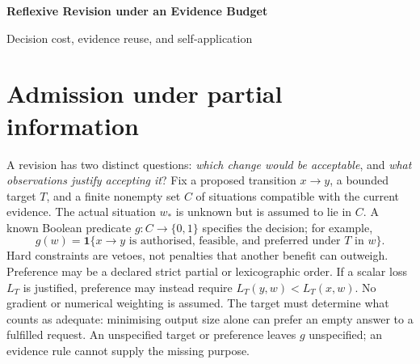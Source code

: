 \documentclass[11pt,letterpaper]{article}
\newcommand{\ind}{\mathbf 1}
\begin{document}
\begin{center}
{\Large\bfseries Reflexive Revision under an Evidence Budget}\par
\vspace{4pt}
{\normalsize Decision cost, evidence reuse, and self-application}
\end{center}
\vspace{-3pt}
\begin{abstract}
A revision decision can be identifiable but unaffordable; evidence sufficient for it can become inadequate when its purpose changes. In a finite exact-observation model, standard decision-tree optimisation gives the minimum worst-case cost of a sound decision, both from current evidence and after reusing a retained record. A classical address-function example separates adaptive inquiry from a fixed test battery. Two elementary obstructions delimit evidence reuse and inference from behavioural parity, while a changing-objective cycle shows why locally justified revision need not terminate. The same account applies to revisions of a method and to revisions made with it. Its guarantees are relative to a specified decision rule and observation model; it neither selects the purpose nor certifies its own premises.
\end{abstract}

\section{Admission under partial information}
A revision has two distinct questions: \emph{which change would be acceptable}, and \emph{what observations justify accepting it}? Fix a proposed transition $x\to y$, a bounded target $T$, and a finite nonempty set $C$ of situations compatible with the current evidence. The actual situation $w_*$ is unknown but is assumed to lie in $C$. A known Boolean predicate $g:C\to\{0,1\}$ specifies the decision; for example,
\begin{equation}
 g(w)=\ind\{\text{$x\to y$ is authorised, feasible, and preferred under $T$ in $w$}\}.
 \label{eq:guard}
\end{equation}
Hard constraints are vetoes, not penalties that another benefit can outweigh. Preference may be a declared strict partial or lexicographic order. If a scalar loss $L_T$ is justified, preference may instead require $L_T(y,w)<L_T(x,w)$. No gradient or numerical weighting is assumed. The target must determine what counts as adequate: minimising output size alone can prefer an empty answer to a fulfilled request. An unspecified target or preference leaves $g$ unspecified; an evidence rule cannot supply the missing purpose.
\end{document}
